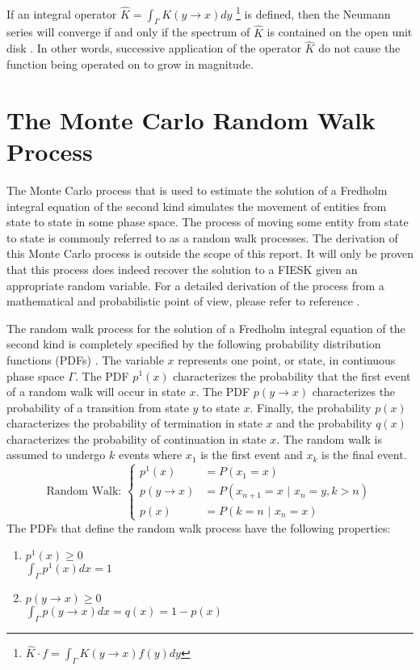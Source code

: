 If an integral operator $\hat{K} = \int_{\Gamma} K(y \to x)dy$
\footnote{$\hat{K} \cdot f = \int_{\Gamma} K(y \to x)f(y)dy$} is defined, then 
the Neumann series will converge if and only if the spectrum of $\hat{K}$ is 
contained on the open unit disk \citep{rahman_integral_2007,morse_methods_1953,spanier_monte_1969}. In other words, successive application of the operator
$\hat{K}$ do not cause the function being operated on to grow in magnitude.

\section{The Monte Carlo Random Walk Process}
\label{sec:mc_random_walk_process}
The Monte Carlo process that is used to estimate the solution of a Fredholm
integral equation of the second kind simulates the movement of entities from
state to state in some phase space. The process of moving some entity from
state to state is commonly referred to as a random walk processes. The 
derivation of this Monte Carlo process is outside the scope of this report. It 
will only be proven that this process does indeed recover the solution to a 
FIESK given an appropriate random variable. For a detailed derivation of the 
process from a mathematical and probabilistic point of view, please refer to 
reference \cite{spanier_monte_1969}. 

The random walk process for the solution of a Fredholm integral equation of
the second kind is completely specified by the following probability
distribution functions (PDFs) \citep{spanier_monte_1969}. The variable $x$ 
represents one point, or state, in continuous phase space $\Gamma$. The 
PDF $p^1(x)$ characterizes the probability that the first event of a random 
walk will occur in state $x$. The PDF $p(y \to x)$ characterizes the probability
of a transition from state $y$ to state $x$. Finally, the probability $p(x)$
characterizes the probability of termination in state $x$ and the probability
$q(x)$ characterizes the probability of continuation in state $x$. The random 
walk is assumed to undergo $k$ events where $x_1$ is the first event and $x_k$ 
is the final event.
\begin{equation}
  \text{Random Walk: }
  \begin{cases}
    p^1(x) & = P(x_1 = x) \\
    p(y \to x) & = P(x_{n+1} = x \text{ | } x_n = y, k > n)  \\
    p(x) & = P(k = n \text{ | } x_n = x) 
  \end{cases}
  \label{eq:mc_random_walk_pdfs}
\end{equation}
The PDFs that define the random walk process have the following properties:
\begin{enumerate}
  \item $p^1(x) \geq 0$ \\
  $\int_{\Gamma} p^1(x)dx = 1$
  \item $p(y \to x) \geq 0$ \\
  $\int_{\Gamma} p(y \to x)dx = q(x) = 1 - p(x)$
\end{enumerate}

